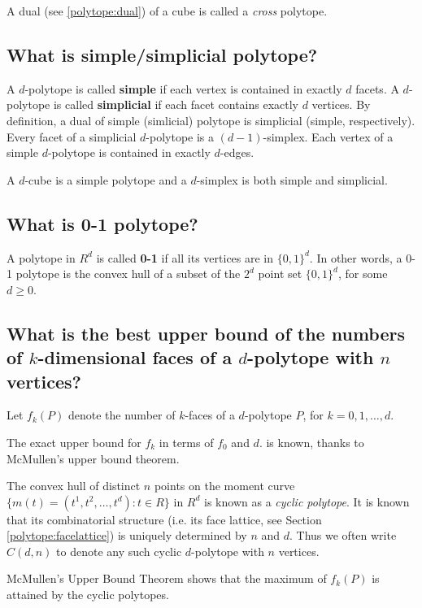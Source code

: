 \documentclass[[a4paper,12pt]{article}
\begin{document}
A dual (see \ref{polytope:dual}) of a cube is called
a {\em cross\/} polytope.

\subsection{What is simple/simplicial polytope?} \label{polytope:simpsimp}

A $d$-polytope is called {\bf simple} if each vertex is contained
in exactly $d$ facets.   A $d$-polytope is called {\bf simplicial} 
if each facet contains exactly $d$ vertices.  By definition,
a dual of simple (simlicial)
polytope is simplicial (simple, respectively).
Every facet of a simplicial $d$-polytope is a $(d-1)$-simplex.  Each vertex
of a simple $d$-polytope is contained in exactly $d$-edges.

A $d$-cube is a simple polytope and a $d$-simplex is both simple and
simplicial.

\subsection{What is 0-1 polytope?} \label{polytope:01}

A polytope in $R^d$ is called {\bf 0-1} if all its vertices
are in $\{0, 1\}^d$.  In other words, a 0-1 polytope is 
the convex hull of a subset of the $2^d$ point set $\{0, 1\}^d$,
for some $d\ge 0$.

\subsection{What is the best upper bound of the numbers of 
$k$-dimensional faces of a $d$-polytope with $n$ vertices?} \label{polytope:upperbound}

Let $f_k(P)$ denote the number of $k$-faces of a $d$-polytope $P$,
for $k=0,1,\ldots,d$.

The exact upper bound for $f_k$ in terms of $f_0$ and $d$.
is known, thanks to McMullen's upper bound theorem.

The convex hull of distinct $n$ points on the moment curve
$\{m(t)=(t^1, t^2, \ldots, t^d) : t\in R \}$ in $R^d$
is known as a {\em cyclic polytope}.   It is known that
its combinatorial structure (i.e. its face lattice, see 
Section \ref{polytope:facelattice})
 is uniquely determined by $n$ and $d$.
Thus we often write $C(d, n)$ to denote any such
cyclic $d$-polytope with $n$ vertices.

McMullen's Upper Bound Theorem shows that the maximum
of $f_k(P)$ is attained by the cyclic polytopes.
 
\end{document}
